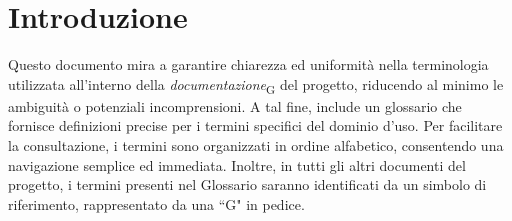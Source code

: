 \section{Introduzione}
Questo documento mira a garantire chiarezza ed uniformità nella terminologia utilizzata all'interno della \textit{documentazione}\textsubscript{G} del progetto, riducendo al minimo le ambiguità o potenziali incomprensioni. A tal fine, include un glossario che fornisce definizioni precise per i termini specifici del dominio d'uso.
Per facilitare la consultazione, i termini sono organizzati in ordine alfabetico, consentendo una navigazione semplice ed immediata. Inoltre, in tutti gli altri documenti del progetto, i termini presenti nel Glossario saranno identificati da un simbolo di riferimento, rappresentato da una ``G" in pedice.